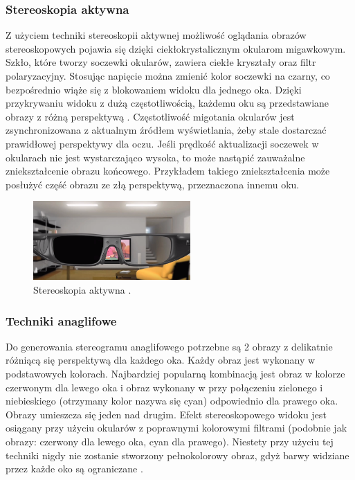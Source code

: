 \subsubsection{Stereoskopia aktywna} 
Z użyciem techniki stereoskopii aktywnej możliwość oglądania obrazów stereoskopowych pojawia się dzięki ciekłokrystalicznym okularom migawkowym. Szkło, które tworzy soczewki okularów, zawiera ciekłe kryształy oraz filtr polaryzacyjny. Stosując napięcie można zmienić kolor soczewki na czarny, co bezpośrednio wiąże się z blokowaniem widoku dla jednego oka. Dzięki przykrywaniu widoku z dużą częstotliwością, każdemu oku są przedstawiane obrazy z różną perspektywą \cite{active3d}. Częstotliwość migotania okularów jest zsynchronizowana z aktualnym źródłem wyświetlania, żeby stale dostarczać prawidłowej perspektywy dla oczu. Jeśli prędkość aktualizacji soczewek w okularach nie jest wystarczająco wysoka, to może nastąpić zauważalne zniekształcenie obrazu końcowego. Przykładem takiego zniekształcenia może posłużyć część obrazu ze złą perspektywą, przeznaczona innemu oku.
\begin{figure}[H]
		\centering
 		\includegraphics[width=6cm]{telewizor.png}
    	\caption{Stereoskopia aktywna \cite{active3d}.}
 		\label{rys2}
\end{figure} 

\subsubsection{Techniki anaglifowe}
Do generowania stereogramu anaglifowego potrzebne są 2 obrazy z delikatnie różniącą się perspektywą dla każdego oka. Każdy obraz jest wykonany w podstawowych kolorach. Najbardziej popularną kombinacją jest obraz w kolorze czerwonym dla lewego oka i obraz wykonany w przy połączeniu zielonego i niebieskiego (otrzymany kolor nazywa się cyan) odpowiednio dla prawego oka. Obrazy umieszcza się jeden nad drugim. Efekt stereoskopowego widoku jest osiągany przy użyciu okularów z poprawnymi kolorowymi filtrami (podobnie jak obrazy: czerwony dla lewego oka, cyan dla prawego). Niestety przy użyciu tej techniki nigdy nie zostanie stworzony pełnokolorowy obraz, gdyż barwy widziane przez każde oko są ograniczane \cite{anaglif}. 

